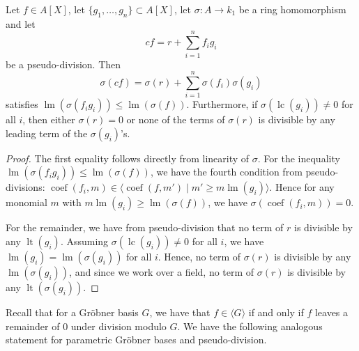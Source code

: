 \documentclass[a4paper, 12pt]{article}
\DeclareMathOperator{\LT}{lt}
\DeclareMathOperator{\LM}{lm}
\DeclareMathOperator{\LC}{lc}
\DeclareMathOperator{\coef}{coef}
\theoremstyle{changedot}
\theoremstyle{changedotbreak}
\theoremstyle{nonumberplain}
\newtheorem{proof}{Proof}
\begin{document}
\begin{lemma}\label{lem:ps_div_to_div}
  Let $f \in A[X]$, let $\{g_{1}, \dots, g_{n}\} \subset A[X]$, let $\sigma : A \to k_{1}$ be a ring homomorphism and let
  \[cf = r + \sum_{i=1}^{n}f_{i}g_{i}\]
  be a pseudo-division. Then
  \[\sigma(cf) = \sigma(r) + \sum_{i=1}^{n} \sigma(f_{i})\sigma(g_{i})\]
  satisfies $\LM(\sigma(f_{i} g_{i})) \leq \LM(\sigma(f))$. Furthermore, if $\sigma(\LC(g_{i})) \neq 0$ for all $i$, then either $\sigma(r) = 0$ or none of the terms of $\sigma(r)$ is divisible by any leading term of the $\sigma(g_{i})$'s.
\end{lemma}
\begin{proof}
  The first equality follows directly from linearity of $\sigma$. For the inequality $\LM(\sigma(f_{i} g_{i})) \leq \LM(\sigma(f))$, we have the fourth condition from pseudo-divisions: $\coef(f_{i}, m) \in \langle \coef(f, m') \mid m' \geq m \LM(g_{i}) \rangle$. Hence for any monomial $m$ with $m\LM(g_{i}) \geq \LM(\sigma(f))$, we have $\sigma(\coef(f_{i}, m)) = 0$.

  For the remainder, we have from pseudo-division that no term of $r$ is divisible by any $\LT(g_{i})$. Assuming $\sigma(\LC(g_{i})) \neq 0$ for all $i$, we have $\LM(g_{i}) = \LM(\sigma(g_{i}))$ for all $i$. Hence, no term of $\sigma(r)$ is divisible by any $\LM(\sigma(g_{i}))$, and since we work over a field, no term of $\sigma(r)$ is divisible by any $\LT(\sigma(g_{i}))$.
\end{proof}

Recall that for a Gröbner basis $G$, we have that $f \in \langle G \rangle$ if and only if $f$ leaves a remainder of $0$ under division modulo $G$. We have the following analogous statement for parametric Gröbner bases and pseudo-division.
\end{document}
